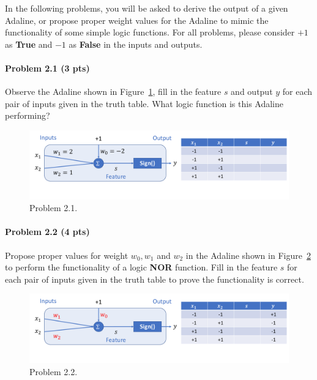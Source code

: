 In the following problems, you will be asked to derive the output of a given Adaline, or propose proper weight values for the Adaline to mimic the functionality of some simple logic functions. For all problems, please consider $+1$ as \textbf{True} and $-1$ as \textbf{False} in the inputs and outputs.

\paragraph{Problem 2.1 (3 pts)} Observe the Adaline shown in Figure~\ref{fig:2.1}, fill in the feature $s$ and output $y$ for each pair of inputs given in the truth table. What logic function is this Adaline performing?

\begin{figure}[h]
\centering
  \includegraphics[width=1.0\linewidth]{Figures1.pdf}
  \vspace{-10pt}
  \caption{Problem 2.1.}
  \label{fig:2.1}
  \vspace{-10pt}
\end{figure}

\paragraph{Problem 2.2 (4 pts)} Propose proper values for weight $w_0, w_1$ and $w_2$ in the Adaline shown in Figure~\ref{fig:2.2} to perform the functionality of a logic \textbf{NOR} function. Fill in the feature $s$ for each pair of inputs given in the truth table to prove the functionality is correct.

\begin{figure}[h]
\centering
  \includegraphics[width=1.0\linewidth]{Figures2.pdf}
  \vspace{-10pt}
  \caption{Problem 2.2.}
  \label{fig:2.2}
  \vspace{-10pt}
\end{figure}

